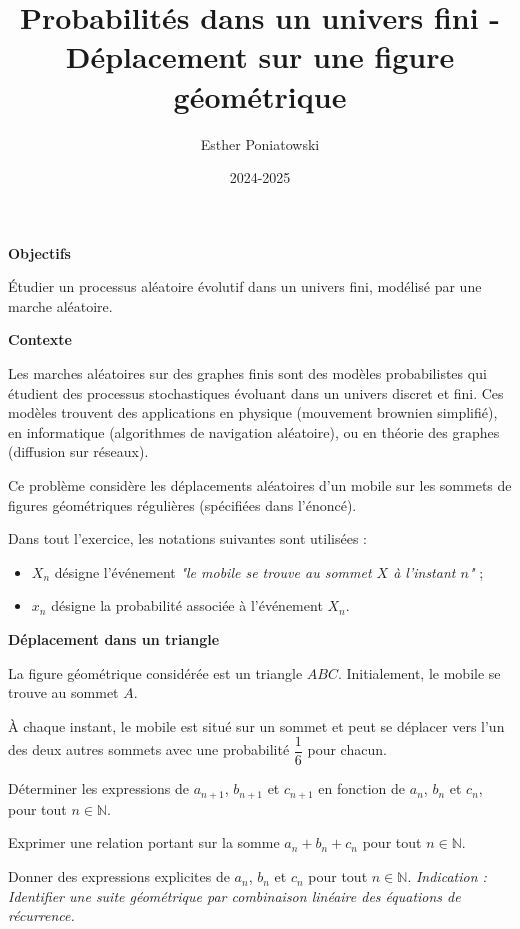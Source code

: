 \documentclass[10pt,a4paper]{article}
\title{Probabilités dans un univers fini - Déplacement sur une figure géométrique}
\author{Esther Poniatowski}
\date{2024-2025}
\begin{document}
\textbf{Objectifs}

Étudier un processus aléatoire évolutif dans un univers fini, modélisé par une marche aléatoire.

\bigskip
\textbf{Contexte}

Les marches aléatoires sur des graphes finis sont des modèles probabilistes qui étudient des
processus stochastiques évoluant dans un univers discret et fini. Ces modèles trouvent des
applications en physique (mouvement brownien simplifié), en informatique (algorithmes de navigation
aléatoire), ou en théorie des graphes (diffusion sur réseaux).


\bigskip

Ce problème considère les déplacements aléatoires d'un mobile sur les sommets de figures
géométriques régulières (spécifiées dans l'énoncé).


Dans tout l'exercice, les notations suivantes sont utilisées :
\begin{itemize}
\item \( X_n \) désigne l'événement \textit{"le mobile se trouve au sommet \( X \) à l'instant \( n
\)"} ;
\item \( x_n \) désigne la probabilité associée à l'événement \( X_n \).
\end{itemize}


\bigskip
\textbf{Déplacement dans un triangle}

La figure géométrique considérée est un triangle \( ABC \). Initialement, le mobile se trouve au
sommet \( A \).

À chaque instant, le mobile est situé sur un sommet et peut se déplacer vers l'un des deux
autres sommets avec une probabilité \( \dfrac{1}{6} \) pour chacun.

\q Déterminer les expressions de \( a_{n+1} \), \( b_{n+1} \) et \( c_{n+1} \) en fonction de \( a_n
\), \( b_n \) et \( c_n \), pour tout \( n \in \mathbb{N} \).

\q Exprimer une relation portant sur la somme \( a_n + b_n + c_n \) pour tout \( n \in
\mathbb{N} \).

\q Donner des expressions explicites de \( a_n \), \( b_n \) et \( c_n \) pour tout \( n \in
\mathbb{N} \). \textit{Indication : Identifier une suite géométrique par combinaison linéaire des
équations de récurrence.}
\end{document}
